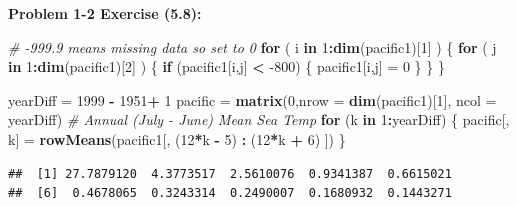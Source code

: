 \documentclass[11pt]{article}
\newenvironment{problem}[1]{\textbf{Problem #1:}}{\newpage}
\newenvironment{Shaded}{\begin{snugshade}}{\end{snugshade}}
\newcommand{\CommentTok}[1]{\textcolor[rgb]{0.56,0.35,0.01}{\textit{#1}}}
\newcommand{\ControlFlowTok}[1]{\textcolor[rgb]{0.13,0.29,0.53}{\textbf{#1}}}
\newcommand{\DataTypeTok}[1]{\textcolor[rgb]{0.13,0.29,0.53}{#1}}
\newcommand{\DecValTok}[1]{\textcolor[rgb]{0.00,0.00,0.81}{#1}}
\newcommand{\KeywordTok}[1]{\textcolor[rgb]{0.13,0.29,0.53}{\textbf{#1}}}
\newcommand{\NormalTok}[1]{#1}
\newcommand{\OperatorTok}[1]{\textcolor[rgb]{0.81,0.36,0.00}{\textbf{#1}}}
\newcommand{\StringTok}[1]{\textcolor[rgb]{0.31,0.60,0.02}{#1}}
\begin{document}
\begin{problem}{1-2 Exercise (5.8)}
\begin{enumerate}[label = (\alph*)]
\begin{Shaded}
\begin{Highlighting}[]
\CommentTok{# -999.9 means missing data so set to 0}
\ControlFlowTok{for}\NormalTok{ ( i }\ControlFlowTok{in} \DecValTok{1}\OperatorTok{:}\KeywordTok{dim}\NormalTok{(pacific1)[}\DecValTok{1}\NormalTok{] ) \{}
  \ControlFlowTok{for}\NormalTok{ ( j }\ControlFlowTok{in} \DecValTok{1}\OperatorTok{:}\KeywordTok{dim}\NormalTok{(pacific1)[}\DecValTok{2}\NormalTok{] ) \{}
    \ControlFlowTok{if}\NormalTok{ (pacific1[i,j] }\OperatorTok{<}\StringTok{ }\DecValTok{-800}\NormalTok{) \{}
\NormalTok{      pacific1[i,j] =}\StringTok{ }\DecValTok{0}
\NormalTok{    \}}
\NormalTok{  \}}
\NormalTok{\}}

\NormalTok{yearDiff =}\StringTok{ }\DecValTok{1999} \OperatorTok{-}\StringTok{ }\DecValTok{1951}\OperatorTok{+}\StringTok{ }\DecValTok{1} 
\NormalTok{pacific =}\StringTok{ }\KeywordTok{matrix}\NormalTok{(}\DecValTok{0}\NormalTok{,}\DataTypeTok{nrow =} \KeywordTok{dim}\NormalTok{(pacific1)[}\DecValTok{1}\NormalTok{], }\DataTypeTok{ncol =}\NormalTok{ yearDiff)}
\CommentTok{# Annual (July - June) Mean Sea Temp}
\ControlFlowTok{for}\NormalTok{ (k }\ControlFlowTok{in} \DecValTok{1}\OperatorTok{:}\NormalTok{yearDiff) \{}
\NormalTok{  pacific[, k] =}\StringTok{ }\KeywordTok{rowMeans}\NormalTok{(pacific1[, (}\DecValTok{12}\OperatorTok{*}\NormalTok{k }\OperatorTok{-}\StringTok{ }\DecValTok{5}\NormalTok{) }\OperatorTok{:}\StringTok{ }\NormalTok{(}\DecValTok{12}\OperatorTok{*}\NormalTok{k }\OperatorTok{+}\StringTok{ }\DecValTok{6}\NormalTok{) ])}
\NormalTok{\}}
\end{Highlighting}
\end{Shaded}
\newpage
\begin{Shaded}
\end{Shaded}
			
\begin{verbatim}
##  [1] 27.7879120  4.3773517  2.5610076  0.9341387  0.6615021  
##  [6]  0.4678065  0.3243314  0.2490007  0.1680932  0.1443271
\end{verbatim}


\end{enumerate}
\end{problem}
\end{document}
